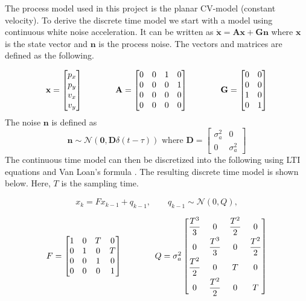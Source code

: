 The process model used in this project is the planar CV-model (constant velocity). To derive the discrete time model we start with a model using continuous white noise acceleration. It can be written as $\mathbf{\dot{x}} = \mathbf{Ax} + \mathbf{Gn}$ where $\mathbf{x}$ is the state vector and $\mathbf{n}$ is the process noise. The vectors and matrices are defined as the following.

\[
\begin{array}{c@{\qquad\qquad}c@{\qquad\qquad}c}
\mathbf{x} = \begin{bmatrix} p_x \\ p_y \\ v_x \\ v_y \end{bmatrix}
&
\mathbf{A} = \begin{bmatrix}
0 & 0 & 1 & 0 \\
0 & 0 & 0 & 1 \\
0 & 0 & 0 & 0 \\
0 & 0 & 0 & 0
\end{bmatrix}
&
\mathbf{G} =
\begin{bmatrix}
0 & 0 \\
0 & 0 \\
1 & 0 \\
0 & 1
\end{bmatrix}
\end{array}
\]
The noise $\mathbf{n}$ is defined as
\[
\mathbf{n} \sim \mathcal{N}(\mathbf{0}, \mathbf{D}\delta(t - \tau)) \text{ where } \mathbf{D} = 
\begin{bmatrix}
    \sigma_a^2 & 0 \\
    0 & \sigma_a^2
\end{bmatrix}
\]
The continuous time model can then be discretized into the following using LTI equations and Van Loan's formula \cite{VanLoan}. The resulting discrete time model is shown below. Here, $T$ is the sampling time.

\[
x_{k} = F x_{k-1} + q_{k-1}, \qquad q_{k-1} \sim \mathcal{N}(0, Q),
\]

\[
\begin{array}{c@{\qquad\qquad}c}
F = \begin{bmatrix}
1 & 0 & T & 0 \\
0 & 1 & 0 & T \\
0 & 0 & 1 & 0 \\
0 & 0 & 0 & 1
\end{bmatrix}
&
Q = \sigma_a^2
\begin{bmatrix}
\dfrac{T^3}{3} & 0 & \dfrac{T^2}{2} & 0 \\[2mm]
0 & \dfrac{T^3}{3} & 0 & \dfrac{T^2}{2} \\[2mm]
\dfrac{T^2}{2} & 0 & T & 0 \\[2mm]
0 & \dfrac{T^2}{2} & 0 & T
\end{bmatrix}
\end{array}
\]

